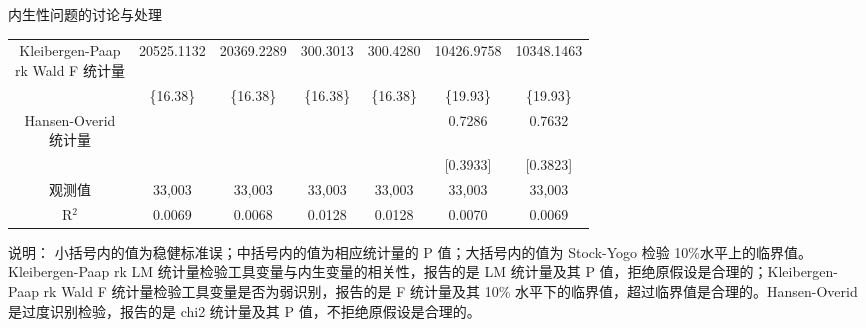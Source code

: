 \documentclass{beamer}
\newcommand{\zhhei}{\CJKfamily{zhhei}}  %
\begin{document}
\begin{frame}{内生性问题的讨论与处理}
{\begin{threeparttable}
\begin{tabular}{ccccccc}
                \makecell[c]{Kleibergen-Paap \\ rk Wald F 统计量} & 20525.1132 & 20369.2289 & 300.3013 & 300.4280 & 10426.9758 & 10348.1463 \\
                & \{16.38\} & \{16.38\} & \{16.38\} & \{16.38\} & \{19.93\} & \{19.93\} \\
                \makecell[c]{Hansen-Overid \\ 统计量} & & & & & 0.7286 & 0.7632 \\
                & & & & & [0.3933] & [0.3823] \\
                观测值 & 33,003 & 33,003 & 33,003 & 33,003 & 33,003 & 33,003 \\
                R$^2$  & 0.0069 & 0.0068 & 0.0128 & 0.0128 & 0.0070 & 0.0069 \\
                \bottomrule
            \end{tabular}
            \begin{tablenotes}
                \item {\zhhei 说明：} 小括号内的值为稳健标准误；中括号内的值为相应统计量的 P 值；大括号内的值为 Stock-Yogo 检验 10\%水平上的临界值。Kleibergen-Paap rk LM 统计量检验工具变量与内生变量的相关性，报告的是 LM 统计量及其 P 值，拒绝原假设是合理的；Kleibergen-Paap rk Wald F 统计量检验工具变量是否为弱识别，报告的是 F 统计量及其 10\% 水平下的临界值，超过临界值是合理的。Hansen-Overid 是过度识别检验，报告的是 chi2 统计量及其 P 值，不拒绝原假设是合理的。
            \end{tablenotes}
        \end{threeparttable}
    }
\end{frame}
\end{document}
